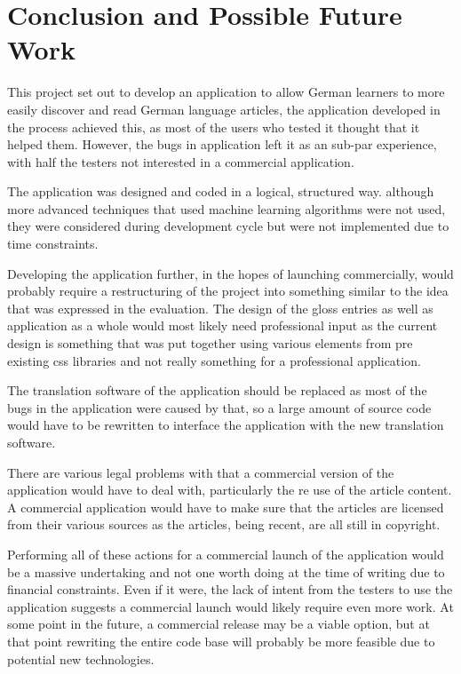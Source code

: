 \chapter{Conclusion and Possible Future Work}

This project set out to develop an application to allow German learners to more easily discover and read German language articles, the application developed in the process achieved this, as most of the users who tested it thought that it helped them. However, the bugs in application left it as an sub-par experience, with half the testers not interested in a commercial application. 

The application was designed and coded in a logical, structured way. although more advanced techniques that used machine learning algorithms were not used, they were considered during development cycle but were not implemented due to time constraints.

Developing the application further, in the hopes of launching commercially, would probably require a restructuring  of the project into something similar to the idea that was expressed in the evaluation. The design of the gloss entries as well as application as a whole would most likely need professional input as the current design is something that was put together using various elements from pre existing css libraries and not really something for a professional application.

The translation software of the application should be replaced as most of the bugs in the application were caused by that, so a large amount of source code would have to be rewritten to interface the application with the new translation software.

There are various legal problems with that a commercial version of the application would have to deal with, particularly the re use of the article content. A commercial application would have to make sure that the articles are licensed from their various sources as the articles, being recent, are all still in copyright.

Performing all of these actions for a commercial launch of the application would be a massive undertaking and not one worth doing at the time of writing due to financial constraints. Even if it were, the lack of intent from the testers to use the application suggests a commercial launch would likely require even more work. At some point in the future, a commercial release may be a viable option, but at that point rewriting the entire code base will probably be more feasible due to potential new technologies. 